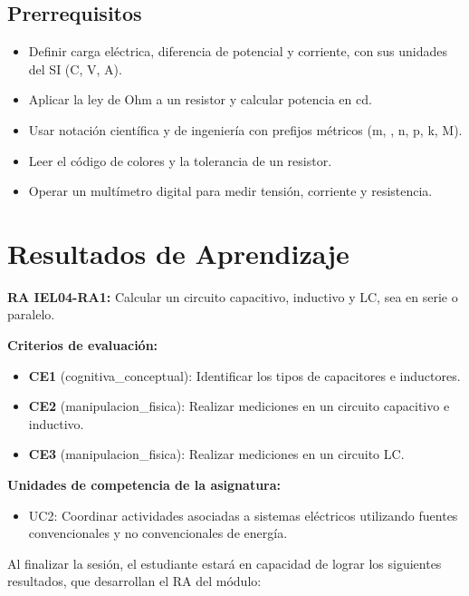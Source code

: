 \documentclass[11pt,letterpaper]{article}
\begin{document}
\subsection{Prerrequisitos}

\begin{itemize}
  \item Definir carga eléctrica, diferencia de potencial y corriente, con sus unidades del SI (C, V, A).
  \item Aplicar la ley de Ohm a un resistor y calcular potencia en cd.
  \item Usar notación científica y de ingeniería con prefijos métricos (m, \textmu{}, n, p, k, M).
  \item Leer el código de colores y la tolerancia de un resistor.
  \item Operar un multímetro digital para medir tensión, corriente y resistencia.
\end{itemize}

\section{Resultados de Aprendizaje}

\begin{alineacion}
\textbf{RA IEL04-RA1:} Calcular un circuito capacitivo, inductivo y LC, sea en serie o paralelo.

\textbf{Criterios de evaluación:}

\begin{itemize}
  \item \textbf{CE1} (cognitiva\_conceptual): Identificar los tipos de capacitores e inductores.
  \item \textbf{CE2} (manipulacion\_fisica): Realizar mediciones en un circuito capacitivo e inductivo.
  \item \textbf{CE3} (manipulacion\_fisica): Realizar mediciones en un circuito LC.
\end{itemize}

\textbf{Unidades de competencia de la asignatura:}

\begin{itemize}
  \item UC2: Coordinar actividades asociadas a sistemas eléctricos utilizando fuentes convencionales y no convencionales de energía.
\end{itemize}
\end{alineacion}

Al finalizar la sesión, el estudiante estará en capacidad de lograr los siguientes resultados, que desarrollan el RA del módulo:
\end{document}
